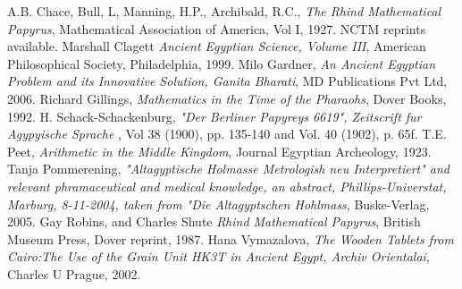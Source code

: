 \documentclass[12pt]{article}
\begin{document}
\begin{thebibliography}{9}
  A.B. Chace, Bull, L, Manning, H.P., Archibald, R.C., \emph{The Rhind Mathematical Papyrus}, Mathematical Association of America, Vol I, 1927. NCTM reprints available.
Marshall Clagett \emph{Ancient Egyptian Science, Volume III}, American Philosophical Society, Philadelphia, 1999.
 Milo Gardner, \emph{An Ancient Egyptian Problem and its Innovative Solution, Ganita Bharati}, MD Publications Pvt Ltd, 2006.
Richard Gillings, \emph{Mathematics in the Time of the Pharaohs}, Dover Books, 1992.
 H. Schack-Schackenburg, \emph{"Der Berliner Papyreys 6619", Zeitscrift fur Agypyische Sprache} , Vol 38 (1900), pp. 135-140 and Vol. 40 (1902), p. 65f.
 T.E. Peet, \emph{Arithmetic in the Middle Kingdom}, Journal Egyptian Archeology, 1923.
 Tanja Pommerening, \emph{"Altagyptische Holmasse Metrologish neu Interpretiert" and relevant phramaceutical and medical knowledge, an abstract,  Phillips-Universtat, Marburg, 8-11-2004, taken from "Die Altagyptschen Hohlmass}, Buske-Verlag, 2005.
 Gay Robins, and Charles Shute \emph{Rhind Mathematical Papyrus}, British Museum Press, Dover reprint, 1987.
 Hana Vymazalova, \emph{The Wooden Tablets from Cairo:The Use of the Grain Unit HK3T in Ancient Egypt, Archiv Orientalai}, Charles U Prague, 2002.
\end{thebibliography}

\end{document}
